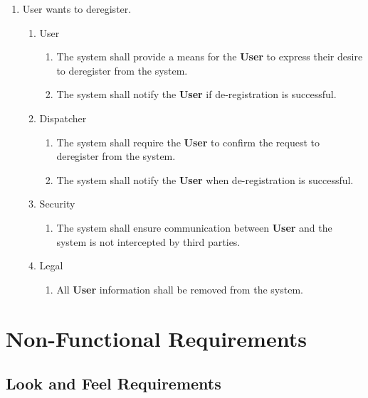 \documentclass[english]{article}
\begin{document}
\begin{enumerate}[{BE}1.]
		\item User wants to deregister.
	\begin{enumerate}[{VP8}.1]
		\item User
			\begin{enumerate}
				\item The system shall provide a means for the \textbf{User} to express their desire to deregister from the system.
				\item The system shall notify the \textbf{User} if de-registration is successful.
			\end{enumerate}
		\item Dispatcher
			\begin{enumerate}
				\item The system shall require the \textbf{User} to confirm the request to deregister from the system. 
				\item The system shall notify the \textbf{User} when de-registration is successful. 
			\end{enumerate}
		\item Security
			\begin{enumerate}
				\item The system shall ensure communication between \textbf{User} and the system is not intercepted by third parties.
			\end{enumerate}
		\item Legal
			\begin{enumerate}
				\item All \textbf{User} information shall be removed from the system.
			\end{enumerate}
	\end{enumerate}

\end{enumerate}


\section{Non-Functional Requirements}
\label{sec:non-functional_requirements}
\subsection{Look and Feel Requirements}
\label{sub:look_and_feel_requirements}
\end{document}
